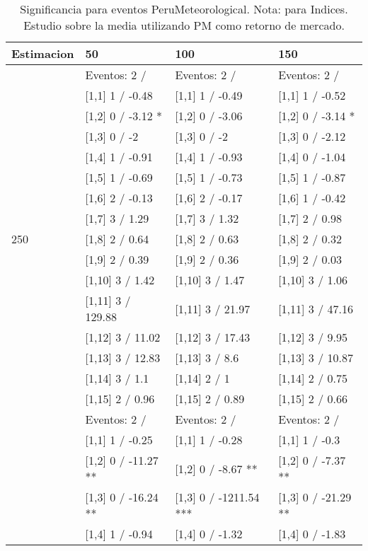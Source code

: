 \begin{table}

\caption{Significancia para eventos PeruMeteorological. Nota: para Indices. Estudio sobre la media utilizando PM como retorno de mercado.}
\centering
\begin{tabular}[t]{llll}
\toprule
Estimacion & 50 & 100 & 150\\
\midrule
 & Eventos:  2 / & Eventos:  2 / & Eventos:  2 /\\
 & {}[1,1] 1  / -0.48 & {}[1,1] 1  / -0.49 & {}[1,1] 1  / -0.52\\
 & {}[1,2] 0  / -3.12 * & {}[1,2] 0  / -3.06 & {}[1,2] 0  / -3.14 *\\
 & {}[1,3] 0  / -2 & {}[1,3] 0  / -2 & {}[1,3] 0  / -2.12\\
 & {}[1,4] 1  / -0.91 & {}[1,4] 1  / -0.93 & {}[1,4] 0  / -1.04\\
\addlinespace
 & {}[1,5] 1  / -0.69 & {}[1,5] 1  / -0.73 & {}[1,5] 1  / -0.87\\
 & {}[1,6] 2  / -0.13 & {}[1,6] 2  / -0.17 & {}[1,6] 1  / -0.42\\
 & {}[1,7] 3  / 1.29 & {}[1,7] 3  / 1.32 & {}[1,7] 2  / 0.98\\
250 & {}[1,8] 2  / 0.64 & {}[1,8] 2  / 0.63 & {}[1,8] 2  / 0.32\\
 & {}[1,9] 2  / 0.39 & {}[1,9] 2  / 0.36 & {}[1,9] 2  / 0.03\\
\addlinespace
 & {}[1,10] 3  / 1.42 & {}[1,10] 3  / 1.47 & {}[1,10] 3  / 1.06\\
 & {}[1,11] 3  / 129.88 & {}[1,11] 3  / 21.97 & {}[1,11] 3  / 47.16\\
 & {}[1,12] 3  / 11.02 & {}[1,12] 3  / 17.43 & {}[1,12] 3  / 9.95\\
 & {}[1,13] 3  / 12.83 & {}[1,13] 3  / 8.6 & {}[1,13] 3  / 10.87\\
 & {}[1,14] 3  / 1.1 & {}[1,14] 2  / 1 & {}[1,14] 2  / 0.75\\
\addlinespace
 & {}[1,15] 2  / 0.96 & {}[1,15] 2  / 0.89 & {}[1,15] 2  / 0.66\\
 & Eventos:  2 / & Eventos:  2 / & Eventos:  2 /\\
 & {}[1,1] 1  / -0.25 & {}[1,1] 1  / -0.28 & {}[1,1] 1  / -0.3\\
 & {}[1,2] 0  / -11.27 ** & {}[1,2] 0  / -8.67 ** & {}[1,2] 0  / -7.37 **\\
 & {}[1,3] 0  / -16.24 ** & {}[1,3] 0  / -1211.54 *** & {}[1,3] 0  / -21.29 **\\
\addlinespace
 & {}[1,4] 1  / -0.94 & {}[1,4] 0  / -1.32 & {}[1,4] 0  / -1.83\\

\end{tabular}
\end{table}
